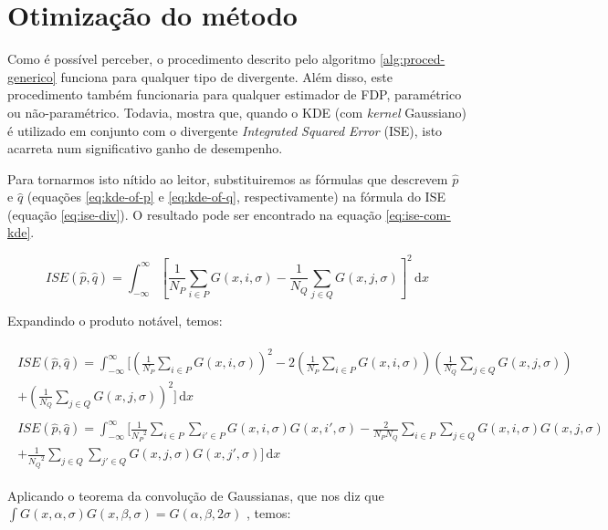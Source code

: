 \section{Otimização do método}
Como é possível perceber, o procedimento descrito pelo algoritmo \ref{alg:proced-generico} funciona para qualquer tipo de divergente. Além disso, este procedimento também funcionaria para qualquer estimador de FDP, paramétrico ou não-paramétrico. Todavia, \citep{cadu:2013} mostra que, quando o KDE (com \textit{kernel} Gaussiano) é utilizado em conjunto com o divergente \textit{Integrated Squared Error} (ISE), isto acarreta num significativo ganho de desempenho.

Para tornarmos isto nítido ao leitor, substituiremos as fórmulas que descrevem $\hat{p}$ e $\hat{q}$ (equações \ref{eq:kde-of-p} e \ref{eq:kde-of-q}, respectivamente) na fórmula do ISE (equação \ref{eq:ise-div}). O resultado pode ser encontrado na equação \ref{eq:ise-com-kde}.

\begin{equation}
ISE(\hat{p}, \hat{q}) = \int_{-\infty}^{\infty} \left[\frac{1}{N_{P}} \sum_{i \in P} G(x, i, \sigma) - \frac{1}{N_{Q}} \sum_{j \in Q} G(x, j, \sigma)\right]^2 \, \mathrm{d}x 
\label{eq:ise-com-kde}
\end{equation}

Expandindo o produto notável, temos:

\begin{gather*}
\begin{split}
ISE(\hat{p}, \hat{q}) = \int_{-\infty}^{\infty} \Bigg[\left(\frac{1}{N_{P}} \sum_{i \in P} G(x, i, \sigma)\right)^2 - 2\left(\frac{1}{N_{P}} \sum_{i \in P} G(x, i, \sigma)\right)\left(\frac{1}{N_{Q}} \sum_{j \in Q} G(x, j, \sigma)\right) \\ + \left(\frac{1}{N_{Q}} \sum_{j \in Q} G(x, j, \sigma)\right)^2\Bigg] \,\mathrm{d}x
\end{split} \\
\begin{split}
ISE(\hat{p}, \hat{q}) = \int_{-\infty}^{\infty} \bigg[\frac{1}{{N_{P}}^2} \sum_{i \in P} \sum_{i' \in P} G(x, i, \sigma) G(x, i', \sigma) - \frac{2}{N_{P}N_{Q}} \sum_{i \in P} \sum_{j \in Q} G(x, i, \sigma) G(x, j, \sigma) \\
+ \frac{1}{{N_{Q}}^2} \sum_{j \in Q} \sum_{j' \in Q} G(x, j, \sigma) G(x, j', \sigma)\bigg] \, \mathrm{d}x 
\end{split}
\end{gather*}

Aplicando o teorema da convolução de Gaussianas, que nos diz que $\int G(x, \alpha, \sigma) G(x, \beta, \sigma) = G(\alpha, \beta, 2\sigma)$ \citep{Principe:2010:ITL:1855180}, temos:

